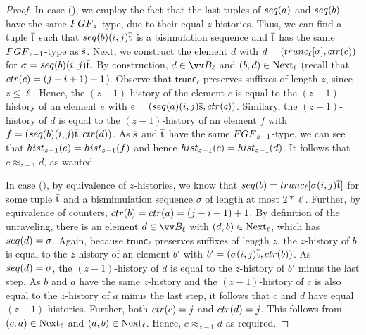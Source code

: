 \begin{proof}
  In case (), we employ the fact that the last tuples of $\seq{a}$ and $\seq{b}$ have the same $\FGF_{z}$-type, due to their equal $z$-histories.
  Thus, we can find a tuple $\overline{\mathrm{t}}$ such that $\seq{b} (i,j) \elemtuplet$ is a bisimulation sequence and $\overline{\mathrm{t}}$ has the same $\FGF_{z-1}$-type as $\overline{\mathrm{s}}$.
  Next, we construct the element $d$ with $d = (\mathsf{trunc}_{\ell}[\sigma], \ctr{c})$ for $\sigma = \seq{b}(i,j)\elemtuplet$.
  By construction, $d \in \unraveldom{B}_{\ell}$ and $(b,d) \in \mathrm{Next}_{\ell}$ (recall that $\ctr{c} = (j-i+1)+1$).
  Observe that $\mathsf{trunc}_{\ell}$ preserves suffixes of length $z$, since $z \le \ell$.
  Hence, the $(z-1)$-history of the element $c$ is equal to the $(z-1)$-history of an element $e$ with $e = (\seq{a}(i,j)\elemtuples, \ctr{c})$.
  Similary, the $(z-1)$-history of $d$ is equal to the $(z-1)$-history of an element $f$ with $f = (\seq{b}(i,j)\elemtuplet, \ctr{d})$.
  As $\overline{\mathrm{s}}$ and $\overline{\mathrm{t}}$ have the same $\FGF_{z-1}$-type, we can see that $\hist{z-1}{e} = \hist{z-1}{f}$ and hence $\hist{z-1}{c} = \hist{z-1}{d}$.
  It follows that $c \approx_{z-1} d$, as wanted.

  In case (), by equivalence of $z$-histories, we know that $\seq{b} = \mathsf{trunc}_{\ell}[\sigma(i,j)\elemtuplet]$ for some tuple $\overline{\mathrm{t}}$ and a bismimulation sequence $\sigma$ of length at most $2 * \ell$.
  Further, by equivalence of counters, $\ctr{b} = \ctr{a} = (j-i+1) + 1$.
  By definition of the unraveling, there is an element $d \in \unraveldom{B}_{\ell}$ with $(d,b) \in \mathrm{Next}_{\ell}$, which has $\seq{d} = \sigma$.
  Again, because $\mathsf{trunc}_{\ell}$ preserves suffixes of length $z$, the $z$-history of $b$ is equal to the $z$-history of an element $b'$ with $b' = (\sigma(i,j)\elemtuplet, \ctr{b})$.
  As $\seq{d} = \sigma$, the $(z-1)$-history of $d$ is equal to the $z$-history of $b'$ minus the last step.
  As $b$ and $a$ have the same $z$-history and the $(z-1)$-history of $c$ is also equal to the $z$-history of $a$ minus the last step, it follows that $c$ and $d$ have equal $(z-1)$-histories.
  Further, both $\ctr{c} = j$ and $\ctr{d} = j$.
  This follows from $(c,a) \in \mathrm{Next}_{\ell}$ and $(d,b) \in \mathrm{Next}_{\ell}$.
  Hence, $c \approx_{z-1} d$ as required.
\end{proof}

